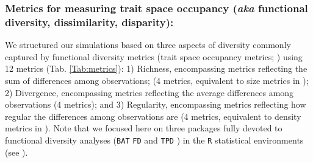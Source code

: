 \documentclass[12pt,letterpaper]{article}
\begin{document}
\subsubsection{Metrics for measuring trait space occupancy (\textit{aka} functional diversity, dissimilarity, disparity):}

We structured our simulations based on three aspects of diversity commonly captured by functional diversity metrics (trait space occupancy metrics; \cite{mammola2021concepts}) using 12 metrics (Tab. \ref{Tab:metrics}):
1) Richness, encompassing metrics reflecting the sum of differences among observations; (4 metrics, equivalent to size metrics in \citealt{guillerme2020shifting});
2) Divergence, encompassing metrics reflecting the average differences among observations (4 metrics); and
3) Regularity, encompassing metrics reflecting how regular the differences among observations are (4 metrics, equivalent to density metrics in \citealt{guillerme2020shifting}).
Note that we focused here on three packages fully devoted to functional diversity analyses (\texttt{BAT} \citealt{cardoso2015bat} \texttt{FD} \citealt{Laliberte2010FD} and \texttt{TPD} \citealt{carmona2019trait}) in the \texttt{R} statistical environments (see \citealt{mammola2021concepts}).
\end{document}
